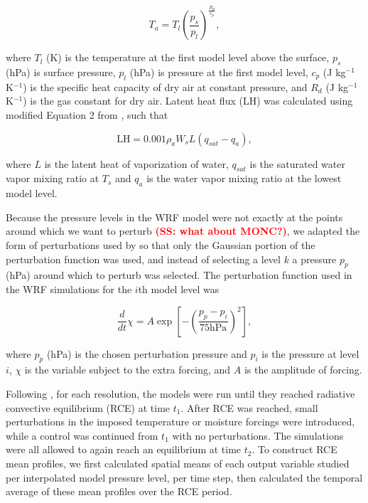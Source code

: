\documentclass[draft]{agujournal2019}
\newcommand{\todo}[1]{\textcolor{red}{\textbf{(#1)}}}
\begin{document}
\begin{equation}
T_a = T_l \left(\frac{p_s}{p_l}\right)^{\frac{R_d}{c_p}},
\end{equation}

\noindent where $T_l$ (K) is the temperature at the first model level above the
surface, $p_s$ (hPa) is surface pressure, $p_l$ (hPa) is pressure at the first
model level, $c_p$ (J kg$^{-1}$ K$^{-1}$) is the specific heat capacity of dry
air at constant pressure, and $R_d$ (J kg$^{-1}$ K$^{-1}$) is the gas constant
for dry air. Latent heat flux (LH) was calculated using modified Equation 2 from
, such that

\begin{equation}
\textrm{LH} = 0.001 \rho_a W_s L (q_{sat} - q_a),
\label{eq:LH}
\end{equation}

\noindent where $L$ is the latent heat of vaporization of water, $q_{sat}$ is
the saturated water vapor mixing ratio at $T_s$ and $q_a$ is the water vapor
mixing ratio at the lowest model level. 

Because the pressure levels in the WRF model were not exactly at the points
around which we want to perturb \todo{SS: what about MONC?}, we adapted the form of perturbations used by
 so that only the Gaussian portion of the perturbation
function was used, and instead of selecting a level $k$ a pressure $p_p$ (hPa)
around which to perturb was selected. The perturbation function used in the WRF
simulations for the $i$th model level was

\begin{equation}
\frac{d}{dt} \chi = A \exp\left[ - \left( \frac{p_p - p_i}{75 \textrm{hPa}}\right)^2 \right],
\end{equation}

\noindent where $p_p$ (hPa) is the chosen perturbation pressure and $p_i$ is the
pressure at level $i$, $\chi$ is the variable subject to the extra forcing, and
$A$ is the amplitude of forcing. 

Following , for each resolution, the models were run until
they reached radiative convective equilibrium (RCE) at time $t_1$. After RCE was
reached, small perturbations in the imposed temperature or moisture forcings
were introduced, while a control was continued from $t_1$ with no perturbations.
The simulations were all allowed to again reach an equilibrium at time $t_2$. To
construct RCE mean profiles, we first calculated spatial means of each output
variable studied per interpolated model pressure level, per time step, then
calculated the temporal average of these mean profiles over the RCE period.
\end{document}

